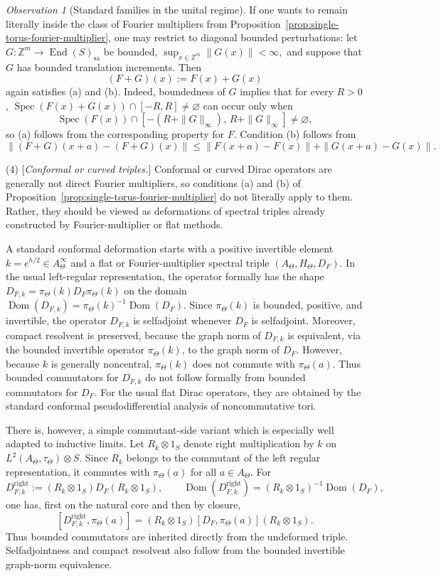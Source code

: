 \documentclass[11pt]{amsart}
\theoremstyle{definition}
\theoremstyle{remark}
\newtheorem{observation}[theorem]{Observation}
\newcommand{\Z}{\mathbb{Z}}
\begin{document}
\begin{observation}[Standard families in the unital regime]
If one wants to remain literally inside the class of Fourier multipliers from
Proposition~\ref{prop:single-torus-fourier-multiplier}, one may restrict to
diagonal bounded perturbations: let $G\colon \Z^m\to \operatorname{End}(S)_{\mathrm{sa}}$
be bounded, $\sup_{x\in\Z^m}\|G(x)\|<\infty,$
and suppose that $G$ has bounded translation increments. Then
\[
(F+G)(x):=F(x)+G(x)
\]
again satisfies \textup{(a)} and \textup{(b)}. Indeed, boundedness of $G$
implies that for every $R>0$, $\operatorname{Spec}(F(x)+G(x))\cap[-R,R]\neq\varnothing$
can occur only when
\[
\operatorname{Spec}(F(x))\cap[-(R+\|G\|_\infty),\,R+\|G\|_\infty]\neq\varnothing,
\]
so \textup{(a)} follows from the corresponding property for $F$. Condition
\textup{(b)} follows from
\[
\|(F+G)(x+a)-(F+G)(x)\|
\le
\|F(x+a)-F(x)\|+\|G(x+a)-G(x)\|.
\]

\smallskip

\noindent
(4) [\emph{Conformal or curved triples.}]
Conformal or curved Dirac operators are generally not direct Fourier
multipliers, so conditions \textup{(a)} and \textup{(b)} of
Proposition~\ref{prop:single-torus-fourier-multiplier} do not literally apply
to them. Rather, they should be viewed as deformations of spectral triples
already constructed by Fourier-multiplier or flat methods.

A standard conformal deformation starts with a positive invertible element $k=e^{h/2}\in A_\Theta^\infty$
and a flat or Fourier-multiplier spectral triple $(A_\Theta,H_\Theta,D_F).$
In the usual left-regular representation, the operator formally has the shape $D_{F,k}=\pi_\Theta(k)D_F\pi_\Theta(k)$
on the domain $\operatorname{Dom}(D_{F,k})=\pi_\Theta(k)^{-1}\operatorname{Dom}(D_F).$
Since $\pi_\Theta(k)$ is bounded, positive, and invertible, the operator
$D_{F,k}$ is selfadjoint whenever $D_F$ is selfadjoint.  Moreover, compact resolvent is
preserved, because the graph norm of $D_{F,k}$ is equivalent, via the bounded
invertible operator $\pi_\Theta(k)$, to the graph norm of $D_F$. However, because $k$ is generally noncentral, $\pi_\Theta(k)$ does not
commute with $\pi_\Theta(a)$. Thus bounded commutators for $D_{F,k}$ do not
follow formally from bounded commutators for $D_F$. For the usual flat Dirac
operators, they are obtained by the standard conformal pseudodifferential
analysis of noncommutative tori.

There is, however, a simple commutant-side variant which is especially well
adapted to inductive limits. Let $R_k\otimes 1_S$ denote right multiplication by $k$ on
$L^2(A_\Theta,\tau_\Theta)\otimes S$. Since $R_k$ belongs to the commutant
of the left regular representation, it commutes with $\pi_\Theta(a)$ for all
$a\in A_\Theta$. For
\[
D_{F,k}^{\mathrm{right}}:=(R_k\otimes 1_S)D_F(R_k\otimes 1_S),
\qquad
\operatorname{Dom}(D_{F,k}^{\mathrm{right}})
=(R_k\otimes 1_S)^{-1}\operatorname{Dom}(D_F),
\]
one has, first on the natural core and then by closure,
\[
[D_{F,k}^{\mathrm{right}},\pi_\Theta(a)]
=
(R_k\otimes 1_S)[D_F,\pi_\Theta(a)](R_k\otimes 1_S).
\]
Thus bounded commutators are inherited directly from the undeformed triple. Selfadjointness and compact resolvent also follow from the bounded invertible
graph-norm equivalence.


\end{observation}
\end{document}
